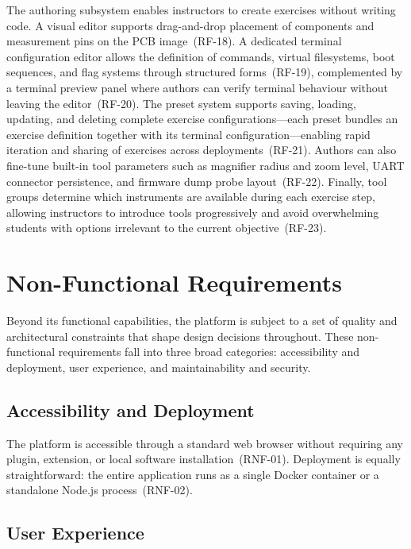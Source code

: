 The authoring subsystem enables instructors to create exercises without writing code. A visual editor supports drag-and-drop placement of components and measurement pins on the PCB image~(RF-18). A dedicated terminal configuration editor allows the definition of commands, virtual filesystems, boot sequences, and flag systems through structured forms~(RF-19), complemented by a terminal preview panel where authors can verify terminal behaviour without leaving the editor~(RF-20). The preset system supports saving, loading, updating, and deleting complete exercise configurations---each preset bundles an exercise definition together with its terminal configuration---enabling rapid iteration and sharing of exercises across deployments~(RF-21). Authors can also fine-tune built-in tool parameters such as magnifier radius and zoom level, UART connector persistence, and firmware dump probe layout~(RF-22). Finally, tool groups determine which instruments are available during each exercise step, allowing instructors to introduce tools progressively and avoid overwhelming students with options irrelevant to the current objective~(RF-23).

\section{Non-Functional Requirements}\label{sec:nonfunctional}

Beyond its functional capabilities, the platform is subject to a set of quality and architectural constraints that shape design decisions throughout. These non-functional requirements fall into three broad categories: accessibility and deployment, user experience, and maintainability and security.

\subsection{Accessibility and Deployment}\label{subsec:rnf-accessibility}

The platform is accessible through a standard web browser without requiring any plugin, extension, or local software installation~(RNF-01). Deployment is equally straightforward: the entire application runs as a single Docker container or a standalone Node.js process~(RNF-02).

\subsection{User Experience}\label{subsec:rnf-ux}

